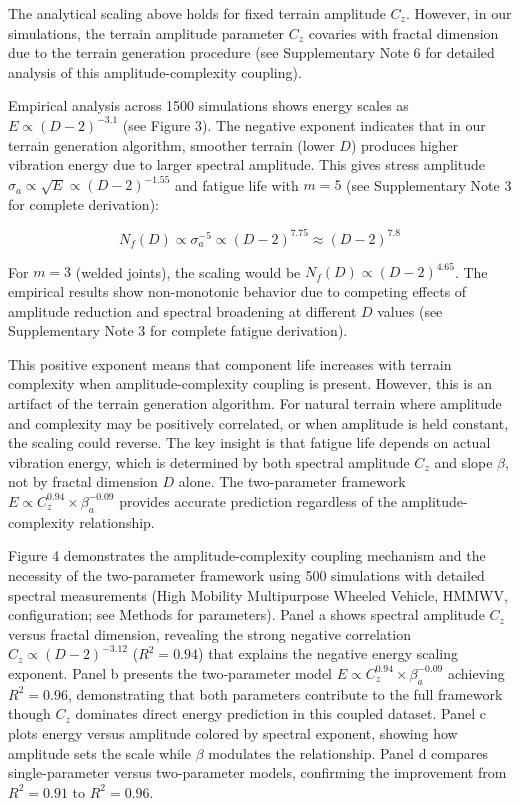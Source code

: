 \documentclass[11pt]{article}
\begin{document}
The analytical scaling above holds for fixed terrain amplitude $C_z$. However, in our simulations, the terrain amplitude parameter $C_z$ covaries with fractal dimension due to the terrain generation procedure (see Supplementary Note 6 for detailed analysis of this amplitude-complexity coupling). 

Empirical analysis across 1500 simulations shows energy scales as $E \propto (D-2)^{-3.1}$ (see Figure 3). The negative exponent indicates that in our terrain generation algorithm, smoother terrain (lower $D$) produces higher vibration energy due to larger spectral amplitude. This gives stress amplitude $\sigma_a \propto \sqrt{E} \propto (D-2)^{-1.55}$ and fatigue life with $m=5$ (see Supplementary Note 3 for complete derivation):

\begin{equation}
N_f(D) \propto \sigma_a^{-5} \propto (D-2)^{7.75} \approx (D-2)^{7.8}
\end{equation}

For $m=3$ (welded joints), the scaling would be $N_f(D) \propto (D-2)^{4.65}$. The empirical results show non-monotonic behavior due to competing effects of amplitude reduction and spectral broadening at different $D$ values (see Supplementary Note 3 for complete fatigue derivation).

This positive exponent means that component life increases with terrain complexity when amplitude-complexity coupling is present. However, this is an artifact of the terrain generation algorithm. For natural terrain where amplitude and complexity may be positively correlated, or when amplitude is held constant, the scaling could reverse. The key insight is that fatigue life depends on actual vibration energy, which is determined by both spectral amplitude $C_z$ and slope $\beta$, not by fractal dimension $D$ alone. The two-parameter framework $E \propto C_z^{0.94} \times \beta_a^{-0.09}$ provides accurate prediction regardless of the amplitude-complexity relationship.


Figure 4 demonstrates the amplitude-complexity coupling mechanism and the necessity of the two-parameter framework using 500 simulations with detailed spectral measurements (High Mobility Multipurpose Wheeled Vehicle, HMMWV, configuration; see Methods for parameters). Panel a shows spectral amplitude $C_z$ versus fractal dimension, revealing the strong negative correlation $C_z \propto (D-2)^{-3.12}$ ($R^2 = 0.94$) that explains the negative energy scaling exponent. Panel b presents the two-parameter model $E \propto C_z^{0.94} \times \beta_a^{-0.09}$ achieving $R^2 = 0.96$, demonstrating that both parameters contribute to the full framework though $C_z$ dominates direct energy prediction in this coupled dataset. Panel c plots energy versus amplitude colored by spectral exponent, showing how amplitude sets the scale while $\beta$ modulates the relationship. Panel d compares single-parameter versus two-parameter models, confirming the improvement from $R^2 = 0.91$ to $R^2 = 0.96$.
\end{document}
